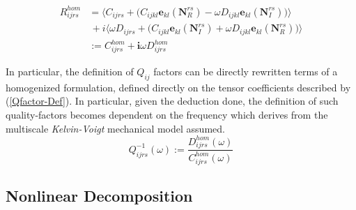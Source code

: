 \begin{equation}
    \begin{aligned}
        R^{hom}_{ijrs} &= \big \langle C_{ijrs} + \big( C_{ijkl}\mathbf{e}_{kl}( \mathbf{N}^{rs}_R) -\omega D_{ijkl}\mathbf{e}_{kl}(\mathbf{N}^{rs}_I) \big) \big \rangle \\
        & \, + i \big \langle \omega D_{ijrs} + \big( C_{ijkl} \mathbf{e}_{kl}(\mathbf{N}^{rs}_I) + \omega D_{ijkl}\mathbf{e}_{kl}(\mathbf{N}^{rs}_R) \big) \big \rangle \\
        & := C^{hom}_{ijrs} + \mathbf{i} \omega D^{hom}_{ijrs}
    \end{aligned}
    \label{ViscoElasticDecom}
\end{equation}

In particular, the definition of $Q_{ij}$ factors can be directly rewritten terms of a homogenized formulation, defined directly on the tensor coefficients described by (\ref{Qfactor-Def}). In particular, given the deduction done, the definition of such quality-factors becomes dependent on the frequency which derives from the multiscale \textit{Kelvin-Voigt} mechanical model assumed.
\begin{equation}
    \label{Qfactor-Def}
    Q_{ijrs}^{-1}(\omega) := \frac{D^{hom}_{ijrs}(\omega)}{ C^{hom}_{ijrs}(\omega)}
\end{equation}


\subsection{Nonlinear Decomposition}

